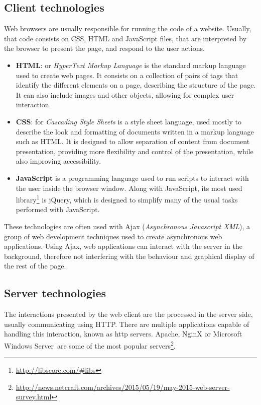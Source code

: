 \subsection{Client technologies}

Web browsers are usually responsible for running the code of a website. Usually, that code consists on CSS, HTML and JavaScript files, that are interpreted by the browser to present the page, and respond to the user actions.

\begin{itemize}
 \item \textbf{HTML}: or \emph{HyperText Markup Language} is the standard markup language used to create web pages. It consists on a collection of pairs of tags that identify the different elements on a page, describing the structure of the page. It can also include images and other objects, allowing for complex user interaction.
\item \textbf{CSS}: for \emph{Cascading Style Sheets} is a style sheet language, used mostly to describe the look and formatting of documents written in a markup language such as HTML. It is designed to allow separation of content from document presentation, providing more flexibility and control of the presentation, while also improving accessibility.
 \item \textbf{JavaScript} is a programming language used to run scripts to interact with the user inside the browser window. Along with JavaScript, its most used library\footnote{\url{http://libscore.com/\#libs}} is jQuery, which is designed to simplify many of the usual tasks performed with JavaScript.
\end{itemize}

These technologies are often used with Ajax (\emph{Asynchronous Javascript XML}), a group of web development techniques used to create asynchronous web applications. Using Ajax, web applications can interact with the server in the background, therefore not interfering with the behaviour and graphical display of the rest of the page.


\subsection{Server technologies}


The interactions presented by the web client are the processed in the server side, usually communicating using HTTP. There are multiple applications capable of handling this interaction, known as http servers. Apache, NginX or Microsoft Windows Server\textregistered~are some of the most popular servers\footnote{\url{http://news.netcraft.com/archives/2015/05/19/may-2015-web-server-survey.html}}. 

